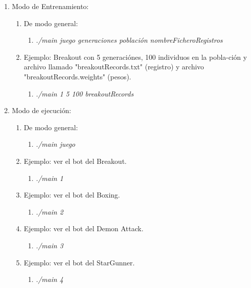 \begin{enumerate}
    \item Modo de Entrenamiento: 
    \begin{enumerate}
        \item De modo general:
        \begin{enumerate}
            \item \textit{./main juego generaciones población nombreFicheroRegistros}
        \end{enumerate}
        \item Ejemplo: Breakout con 5 generaciónes, 100 individuos en la pobla-ción y archivo llamado "breakoutRecords.txt" (registro) y archivo "breakoutRecords.weights" (pesos).
        \begin{enumerate}
            \item \textit{./main 1 5 100 breakoutRecords}
        \end{enumerate}
    \end{enumerate}
    \item Modo de ejecución:
    \begin{enumerate}
        \item De modo general:
        \begin{enumerate}
            \item \textit{./main juego}
        \end{enumerate}
        \item Ejemplo: ver el bot del Breakout.
        \begin{enumerate}
            \item \textit{./main 1}
        \end{enumerate}
        \item Ejemplo: ver el bot del Boxing.
        \begin{enumerate}
            \item \textit{./main 2}
        \end{enumerate}
        \item Ejemplo: ver el bot del Demon Attack.
        \begin{enumerate}
            \item \textit{./main 3}
        \end{enumerate}
        \item Ejemplo: ver el bot del StarGunner.
        \begin{enumerate}
            \item \textit{./main 4}
        \end{enumerate}
    \end{enumerate}
\end{enumerate}

\newpage